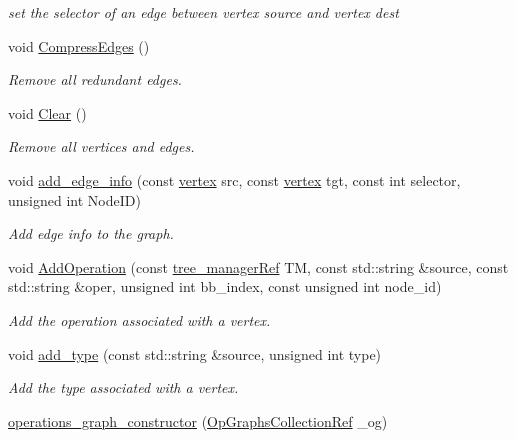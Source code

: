 \begin{DoxyCompactItemize}
\begin{DoxyCompactList}\small\item\em set the selector of an edge between vertex source and vertex dest \end{DoxyCompactList}\item 
void \hyperlink{classoperations__graph__constructor_adc71534552b58f6c0a3b9b254fe09617}{Compress\+Edges} ()
\begin{DoxyCompactList}\small\item\em Remove all redundant edges. \end{DoxyCompactList}\item 
void \hyperlink{classoperations__graph__constructor_ad1f93cb580bb9b0fbee3ff28c124929a}{Clear} ()
\begin{DoxyCompactList}\small\item\em Remove all vertices and edges. \end{DoxyCompactList}\item 
void \hyperlink{classoperations__graph__constructor_a92acb720c7197a91ae01ccdf364e9c88}{add\+\_\+edge\+\_\+info} (const \hyperlink{graph_8hpp_abefdcf0544e601805af44eca032cca14}{vertex} src, const \hyperlink{graph_8hpp_abefdcf0544e601805af44eca032cca14}{vertex} tgt, const int selector, unsigned int Node\+ID)
\begin{DoxyCompactList}\small\item\em Add edge info to the graph. \end{DoxyCompactList}\item 
void \hyperlink{classoperations__graph__constructor_a39983121573e9c7e5e92ede5635a8001}{Add\+Operation} (const \hyperlink{tree__manager_8hpp_a96ff150c071ce11a9a7a1e40590f205e}{tree\+\_\+manager\+Ref} TM, const std\+::string \&source, const std\+::string \&oper, unsigned int bb\+\_\+index, const unsigned int node\+\_\+id)
\begin{DoxyCompactList}\small\item\em Add the operation associated with a vertex. \end{DoxyCompactList}\item 
void \hyperlink{classoperations__graph__constructor_af785ad7c0d28fe5427a55d9cebafafec}{add\+\_\+type} (const std\+::string \&source, unsigned int type)
\begin{DoxyCompactList}\small\item\em Add the type associated with a vertex. \end{DoxyCompactList}\item 
\hyperlink{classoperations__graph__constructor_a3158fc69235da451a4a7397302d12f82}{operations\+\_\+graph\+\_\+constructor} (\hyperlink{op__graph_8hpp_a6a9918dc96f448814ad35759f9460ed7}{Op\+Graphs\+Collection\+Ref} \+\_\+og)

\end{DoxyCompactItemize}
